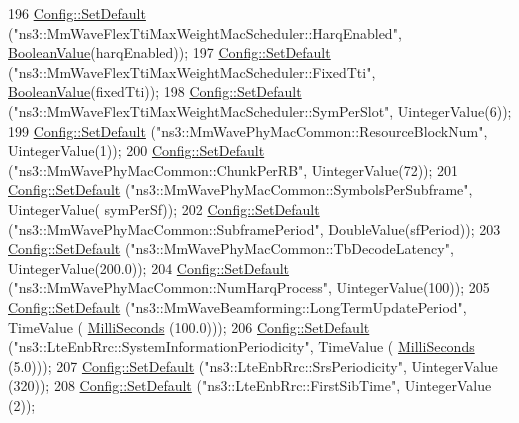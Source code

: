 \begin{DoxyCode}
{{{196   \hyperlink{group__config_ga2e7882df849d8ba4aaad31c934c40c06}{Config::SetDefault} (\textcolor{stringliteral}{"ns3::MmWaveFlexTtiMaxWeightMacScheduler::HarqEnabled"}, 
      \hyperlink{classns3_1_1BooleanValue}{BooleanValue}(harqEnabled));
197   \hyperlink{group__config_ga2e7882df849d8ba4aaad31c934c40c06}{Config::SetDefault} (\textcolor{stringliteral}{"ns3::MmWaveFlexTtiMaxWeightMacScheduler::FixedTti"}, 
      \hyperlink{classns3_1_1BooleanValue}{BooleanValue}(fixedTti));
198   \hyperlink{group__config_ga2e7882df849d8ba4aaad31c934c40c06}{Config::SetDefault} (\textcolor{stringliteral}{"ns3::MmWaveFlexTtiMaxWeightMacScheduler::SymPerSlot"}, 
      UintegerValue(6));
199   \hyperlink{group__config_ga2e7882df849d8ba4aaad31c934c40c06}{Config::SetDefault} (\textcolor{stringliteral}{"ns3::MmWavePhyMacCommon::ResourceBlockNum"}, UintegerValue(1));
200   \hyperlink{group__config_ga2e7882df849d8ba4aaad31c934c40c06}{Config::SetDefault} (\textcolor{stringliteral}{"ns3::MmWavePhyMacCommon::ChunkPerRB"}, UintegerValue(72));
201   \hyperlink{group__config_ga2e7882df849d8ba4aaad31c934c40c06}{Config::SetDefault} (\textcolor{stringliteral}{"ns3::MmWavePhyMacCommon::SymbolsPerSubframe"}, UintegerValue(
      symPerSf));
202   \hyperlink{group__config_ga2e7882df849d8ba4aaad31c934c40c06}{Config::SetDefault} (\textcolor{stringliteral}{"ns3::MmWavePhyMacCommon::SubframePeriod"}, DoubleValue(sfPeriod));
203   \hyperlink{group__config_ga2e7882df849d8ba4aaad31c934c40c06}{Config::SetDefault} (\textcolor{stringliteral}{"ns3::MmWavePhyMacCommon::TbDecodeLatency"}, UintegerValue(200.0));
204   \hyperlink{group__config_ga2e7882df849d8ba4aaad31c934c40c06}{Config::SetDefault} (\textcolor{stringliteral}{"ns3::MmWavePhyMacCommon::NumHarqProcess"}, UintegerValue(100));
205   \hyperlink{group__config_ga2e7882df849d8ba4aaad31c934c40c06}{Config::SetDefault} (\textcolor{stringliteral}{"ns3::MmWaveBeamforming::LongTermUpdatePeriod"}, TimeValue (
      \hyperlink{group__timecivil_gaf26127cf4571146b83a92ee18679c7a9}{MilliSeconds} (100.0)));
206   \hyperlink{group__config_ga2e7882df849d8ba4aaad31c934c40c06}{Config::SetDefault} (\textcolor{stringliteral}{"ns3::LteEnbRrc::SystemInformationPeriodicity"}, TimeValue (
      \hyperlink{group__timecivil_gaf26127cf4571146b83a92ee18679c7a9}{MilliSeconds} (5.0)));
207   \hyperlink{group__config_ga2e7882df849d8ba4aaad31c934c40c06}{Config::SetDefault} (\textcolor{stringliteral}{"ns3::LteEnbRrc::SrsPeriodicity"}, UintegerValue (320));
208   \hyperlink{group__config_ga2e7882df849d8ba4aaad31c934c40c06}{Config::SetDefault} (\textcolor{stringliteral}{"ns3::LteEnbRrc::FirstSibTime"}, UintegerValue (2));
}}}
\end{DoxyCode}
